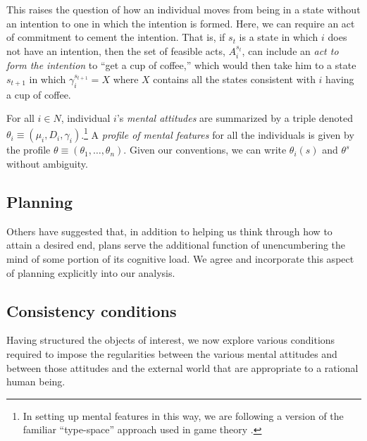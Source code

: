 \documentclass[
11pt,
titlepage,
reqno,
]{article}%
\theoremstyle{definition}
\begin{document}
	This raises the question of how an individual moves from being in a state without an intention to one in which the intention is formed. 
	Here, we can require an act of commitment to cement the intention. 
	That is, if $s_t$ is a state in which $i$ does not have an intention, then the set of feasible acts, $A^{s_t}_i$, can include an \textit{act to form the intention} to ``get a cup of coffee,'' which would then take him to a state $s_{t+1}$ in which $\gamma_i^{s_{t+1}}=X$ where $X$ contains all the states consistent with $i$ having a cup of coffee.
	
	For all $i\in N$, individual $i$'s \textit{mental attitudes} are summarized by a triple denoted $\theta_i\equiv(\mu_i,D_i,\gamma_i)$.\footnote
	{
		In setting up mental features in this way, we are following a version of the familiar ``type-space'' approach used in game theory \citep[See][]{Harsanyi1967, Mertens1985a}. 
	} 
	A \textit{profile of mental features} for all the individuals is given by the profile $\theta\equiv(\theta_1,\ldots,\theta_n)$. 
	Given our conventions, we can write $\theta_i(s)$ and $\theta^s$ without ambiguity.
	
	
\subsection{Planning}
Others have suggested that, in addition to helping us think through how to attain a desired end, plans serve the additional function of unencumbering the mind of some portion of its cognitive load. 
We agree and incorporate this aspect of planning explicitly into our analysis.
	

	\subsection{Consistency conditions\label{sec:consistencies}}
	
	Having structured the objects of interest, we now explore various conditions required to impose the regularities between the various mental attitudes and between those attitudes and the external world that are appropriate to a rational human being. 
	
\end{document}
